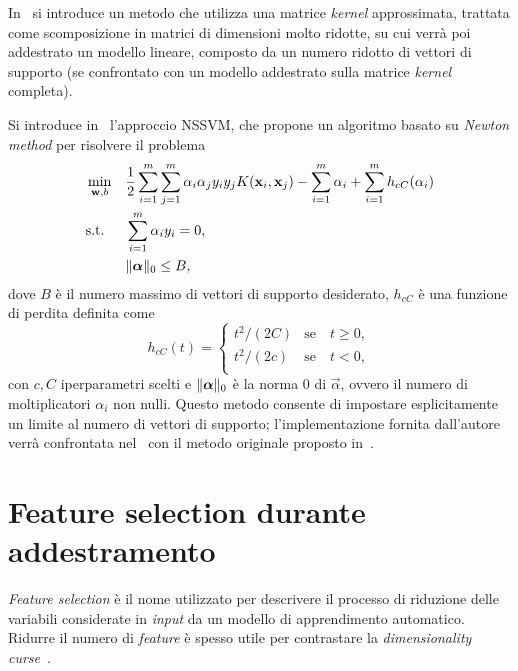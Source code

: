 
In~\cite{2012_LLSVM} si introduce un metodo che utilizza una matrice \emph{kernel} approssimata, trattata come scomposizione in matrici di dimensioni molto ridotte, su cui verrà poi addestrato un modello lineare, composto da un numero ridotto di vettori di supporto (se confrontato con un modello addestrato sulla matrice \emph{kernel} completa).

Si introduce in~\cite{2020_sparse_svm} l'approccio NSSVM, che propone un algoritmo basato su \emph{Newton method} per risolvere il problema
\begin{equation*}
\begin{aligned}
& \min_{\vec{w}, b}     && \frac{1}{2}\sum_{i=1}^{m}\sum_{j=1}^{m}\alpha_i\alpha_jy_iy_jK(\Vec{x}_i, \Vec{x}_j) - \sum_{i=1}^{m}\alpha_i + \sum_{i=1}^{m} h_{cC}(\alpha_i)\\
&\textrm{s.t.}          && \sum_{i=1}^{m}\alpha_iy_i=0, \\
&                       && \norm{\Vec{\alpha}}_0 \leq B,
\end{aligned}
\end{equation*}
dove $B$ è il numero massimo di vettori di supporto desiderato, $h_{cC}$ è una funzione di perdita definita come
\begin{equation*}
h_{cC}(t) = \begin{cases}
            t^2/(2C) & \text{se} \quad t \geq 0, \\
            t^2/(2c) & \text{se} \quad t < 0, \\
            \end{cases}
\end{equation*}
con $c,C$ iperparametri scelti e $\norm{\Vec{\alpha}}_0$ è la norma 0 di $\Vec{\alpha}$, ovvero il numero di moltiplicatori $\alpha_i$ non nulli.
Questo metodo consente di impostare esplicitamente un limite al numero di vettori di supporto; 
l'implementazione fornita dall'autore verrà confrontata nel~ con il metodo originale proposto in~.

\section{Feature selection durante addestramento}\label{sec:sparsesvm:feature-selection}
\emph{Feature selection} è il nome utilizzato per descrivere il processo di riduzione delle variabili considerate in \emph{input} da un modello di apprendimento automatico.
Ridurre il numero di \emph{feature} è spesso utile per contrastare la \emph{dimensionality curse}~\cite{elements-of-statistical-learning}.

